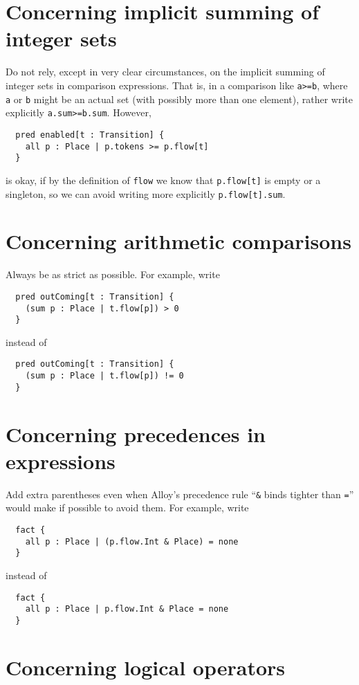 \documentclass{article}
\begin{document}
\section*{Concerning implicit summing of integer sets}

Do not rely, except in very clear circumstances, on the implicit summing of integer sets in comparison expressions.
That is, in a comparison like \lstinline|a>=b|, where \lstinline|a| or \lstinline|b| might be an actual set (with possibly more than one element), rather write explicitly \lstinline|a.sum>=b.sum|.
However,
\begin{lstlisting}
  pred enabled[t : Transition] {
    all p : Place | p.tokens >= p.flow[t]
  }
\end{lstlisting}
is okay, if by the definition of \lstinline|flow| we know that \lstinline|p.flow[t]| is empty or a singleton, so we can avoid writing more explicitly \lstinline|p.flow[t].sum|.

\section*{Concerning arithmetic comparisons}

Always be as strict as possible.
For example, write
\begin{lstlisting}
  pred outComing[t : Transition] {
    (sum p : Place | t.flow[p]) > 0
  }
\end{lstlisting}
instead of
\begin{lstlisting}
  pred outComing[t : Transition] {
    (sum p : Place | t.flow[p]) != 0
  }
\end{lstlisting}

\section*{Concerning precedences in expressions}

Add extra parentheses even when Alloy's precedence rule ``\lstinline|&| binds tighter than \lstinline|=|'' would make if possible to avoid them.
For example, write
\begin{lstlisting}
  fact {
    all p : Place | (p.flow.Int & Place) = none
  }
\end{lstlisting}
instead of
\begin{lstlisting}
  fact {
    all p : Place | p.flow.Int & Place = none
  }
\end{lstlisting}

\section*{Concerning logical operators}
\end{document}
